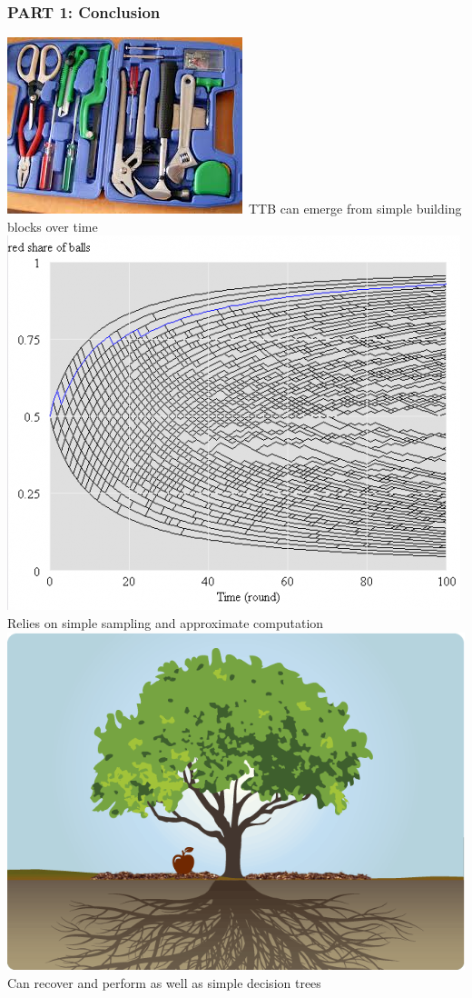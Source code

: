 \documentclass{beamer}
\begin{document}
\begin{frame}
 \frametitle{PART 1: Conclusion}
  \includegraphics[scale=0.12]{tools.jpeg}~TTB can emerge from simple building blocks over time\medskip\\
 \includegraphics[scale=0.07]{polya.png} Relies on simple sampling and approximate computation\medskip\\
\includegraphics[scale=0.05]{realtree.png} Can recover and perform as well as simple decision trees\bigskip\\

\end{frame}
\end{document}
